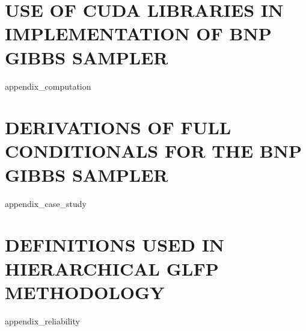 \documentclass[11pt]{isuthesis}
\begin{document}
\appendixtitle
\appendix

\chapter{USE OF CUDA LIBRARIES IN IMPLEMENTATION OF BNP GIBBS SAMPLER}
{appendix_computation}

\chapter{DERIVATIONS OF FULL CONDITIONALS FOR THE BNP GIBBS SAMPLER}
{appendix_case_study}

\chapter{DEFINITIONS USED IN HIERARCHICAL GLFP METHODOLOGY}
{appendix_reliability}

\unappendixtitle
\end{document}
